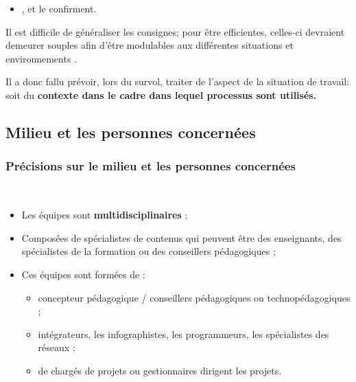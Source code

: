 \begin{frame}[allowframebreaks]
\begin{itemize}
                   \item \citet[p.10]{retalis1997a}, \citet[p.46]{smith2006a} et \citet[p.3]{pohl2004a} le confirment.
                   \end{itemize}
			\par Il est difficile de généraliser les consignes; pour être efficientes, celles-ci devraient demeurer souples afin d'être modulables aux différentes situations et environnements \citep[p.3]{pohl2004a}.
			\framebreak
			\par  Il a donc fallu prévoir, lors du survol, traiter de l’aspect de la situation de travail: soit du \textbf{contexte dans le cadre dans lequel processus sont utilisés.}
                \end{frame}

\subsection{Milieu et les personnes concernées} 
		\begin{frame}[allowframebreaks]
			\frametitle{Précisions sur le milieu et les personnes concernées}
                        \
                        \begin{itemize} 
                        \item  Les équipes sont \textbf{multidisciplinaires} ;
                        \item Composées de spécialistes de contenus qui peuvent être des enseignants, des spécialistes de la formation ou des conseillers pédagogiques ;
                        \item Ces équipes sont formées de : 
                        	\begin{itemize}
                        		\item concepteur pédagogique / conseillers pédagogiques ou technopédagogiques ;
                        		\item intégrateurs, les infographistes, les programmeurs, les spécialistes des réseaux ;
                        		\item de chargés de projets ou gestionnaires dirigent les projets.
                        	\end{itemize}

                        \end{itemize}

             
                \end{frame}

